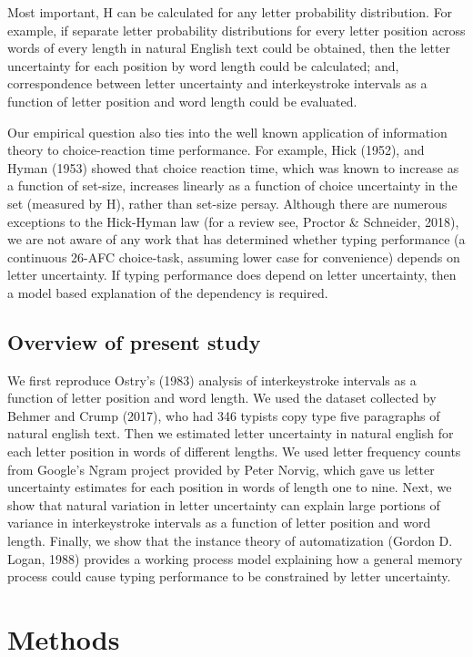 \documentclass[floatsintext,man]{apa6}
\theoremstyle{definition}
\theoremstyle{definition}
\theoremstyle{definition}
\theoremstyle{remark}
\begin{document}
Most important, H can be calculated for any letter probability
distribution. For example, if separate letter probability distributions
for every letter position across words of every length in natural
English text could be obtained, then the letter uncertainty for each
position by word length could be calculated; and, correspondence between
letter uncertainty and interkeystroke intervals as a function of letter
position and word length could be evaluated.

Our empirical question also ties into the well known application of
information theory to choice-reaction time performance. For example,
Hick (1952), and Hyman (1953) showed that choice reaction time, which
was known to increase as a function of set-size, increases linearly as a
function of choice uncertainty in the set (measured by H), rather than
set-size persay. Although there are numerous exceptions to the
Hick-Hyman law (for a review see, Proctor \& Schneider, 2018), we are
not aware of any work that has determined whether typing performance (a
continuous 26-AFC choice-task, assuming lower case for convenience)
depends on letter uncertainty. If typing performance does depend on
letter uncertainty, then a model based explanation of the dependency is
required.

\subsection{Overview of present study}\label{overview-of-present-study}

We first reproduce Ostry's (1983) analysis of interkeystroke intervals
as a function of letter position and word length. We used the dataset
collected by Behmer and Crump (2017), who had 346 typists copy type five
paragraphs of natural english text. Then we estimated letter uncertainty
in natural english for each letter position in words of different
lengths. We used letter frequency counts from Google's Ngram project
provided by Peter Norvig, which gave us letter uncertainty estimates for
each position in words of length one to nine. Next, we show that natural
variation in letter uncertainty can explain large portions of variance
in interkeystroke intervals as a function of letter position and word
length. Finally, we show that the instance theory of automatization
(Gordon D. Logan, 1988) provides a working process model explaining how
a general memory process could cause typing performance to be
constrained by letter uncertainty.

\section{Methods}\label{methods}
\end{document}
